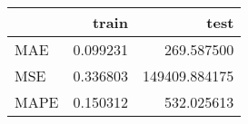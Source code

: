 \begin{tabular}{lrr}
\toprule
{} &     train &           test \\
\midrule
MAE  &  0.099231 &     269.587500 \\
MSE  &  0.336803 &  149409.884175 \\
MAPE &  0.150312 &     532.025613 \\
\bottomrule
\end{tabular}
